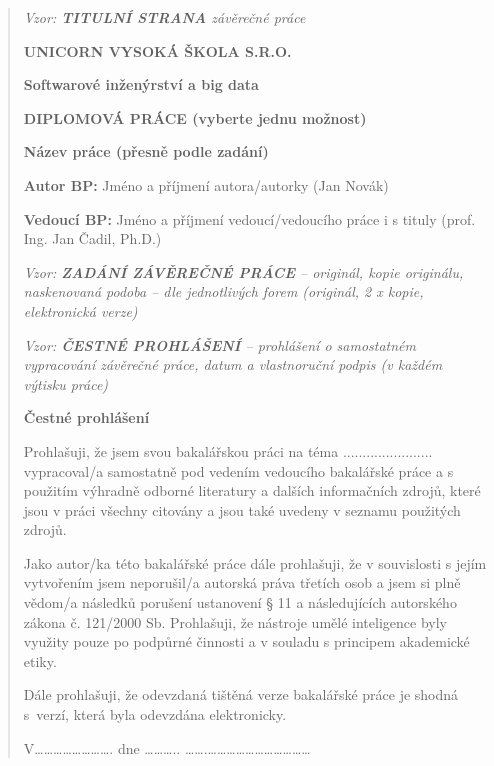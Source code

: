 \documentclass[
]{article}
\begin{document}
\newpage
\begin{quote}
  \thispagestyle{empty}
  \emph{Vzor: \textbf{TITULNÍ STRANA} závěrečné práce}

  \textbf{UNICORN VYSOKÁ ŠKOLA S.R.O.}

  \textbf{Softwarové inženýrství a big data}


  \textbf{DIPLOMOVÁ PRÁCE (vyberte jednu možnost)}

  \textbf{Název práce (přesně podle zadání)}

  \textbf{Autor BP:} Jméno a příjmení autora/autorky (Jan Novák)

  \textbf{Vedoucí BP:} Jméno a příjmení vedoucí/vedoucího práce i s tituly
  (prof. Ing. Jan Čadil, Ph.D.)

  \newpage
  \thispagestyle{empty}
  \emph{Vzor: \textbf{ZADÁNÍ ZÁVĚREČNÉ PRÁCE} -- originál, kopie
    originálu, naskenovaná podoba -- dle jednotlivých forem (originál, 2 x
    kopie, elektronická verze)}

  \newpage
  \thispagestyle{empty}
  \emph{Vzor: \textbf{ČESTNÉ PROHLÁŠENÍ} -- prohlášení o samostatném
    vypracování závěrečné práce, datum a vlastnoruční podpis (v každém
    výtisku práce)}

  \textbf{Čestné prohlášení}

  Prohlašuji, že jsem svou bakalářskou práci na téma
  ....................... vypracoval/a samostatně pod vedením vedoucího
  bakalářské práce a s použitím výhradně odborné literatury a dalších
  informačních zdrojů, které jsou v práci všechny citovány a jsou také
  uvedeny v seznamu použitých zdrojů.

  Jako autor/ka této bakalářské práce dále prohlašuji, že v souvislosti s
  jejím vytvořením jsem neporušil/a autorská práva třetích osob a jsem si
  plně vědom/a následků porušení ustanovení § 11 a následujících
  autorského zákona č. 121/2000 Sb. Prohlašuji, že nástroje umělé inteligence byly využity pouze po podpůrné činnosti a v souladu s principem akademické etiky.

  Dále prohlašuji, že odevzdaná tištěná verze bakalářské práce je shodná
  s~verzí, která byla odevzdána elektronicky.

  V\ldots\ldots\ldots\ldots\ldots\ldots\ldots\ldots. dne
  \ldots\ldots\ldots..
  \ldots\ldots.\ldots\ldots\ldots\ldots\ldots\ldots\ldots\ldots\ldots\ldots\ldots{}


\end{quote}
\end{document}
